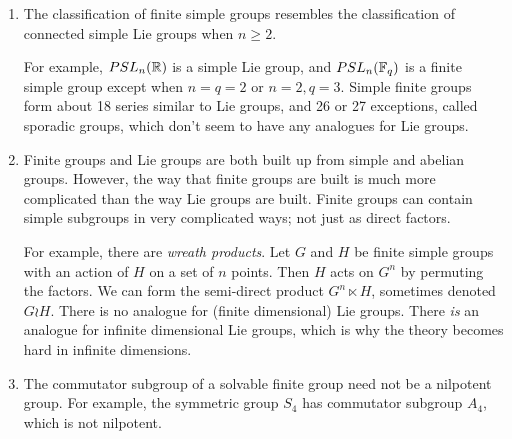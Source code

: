  \begin{enumerate}
 \item The classification of finite simple groups resembles the classification of
 connected simple Lie groups when $n\ge 2$. 

 For example, $PSL_n(\mathbb{R})$ is a simple Lie group, and $PSL_n(\mathbb{F}_q)$ is a finite
 simple group except when $n=q=2$ or $n=2,q=3$. Simple finite groups form about 18
 series similar to Lie groups, and 26 or 27 exceptions, called sporadic groups, which
 don't seem to have any analogues for Lie groups.

 \item Finite groups and Lie groups are both built up from simple and abelian groups.
 However, the way that finite groups are built is much more complicated than the way
 Lie groups are built. Finite groups can contain simple subgroups in very complicated
 ways; not just as direct factors.

 For example, there are \emph{wreath products}. Let $G$
 and $H$ be finite simple groups with an action of $H$ on a set of $n$ points. Then
 $H$ acts on $G^n$ by permuting the factors. We can form the semi-direct product
 $G^n\ltimes H$, sometimes denoted $G\wr H$. There is no analogue for (finite
 dimensional) Lie groups. There \emph{is} an analogue for infinite dimensional Lie
 groups, which is why the theory becomes hard in infinite dimensions.

 \item The commutator subgroup of a solvable finite group need not be a nilpotent
 group. For example, the symmetric group $S_4$ has commutator subgroup $A_4$, which is
 not nilpotent.

 \end{enumerate}

